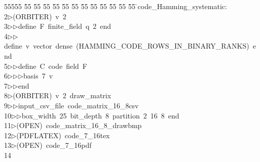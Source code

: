 %
%
\begin{tabbing}
55555 \= 55 \= 55 \= 55 \= 55 \= 55 \= 55 \= 55 \= 55 \= 55 \= 55 \= 55 \= 55 \= \>code\_Hamming\_systematic:\\[0pt]
2\>$\triangleright$\>(ORBITER)\ v\ 2\ \\[0pt]
3\>$\triangleright$\>$\triangleright$\>define\ F\ finite\_field\ q\ 2\ end\ \\[0pt]
4\>$\triangleright$\>$\triangleright$\>define\ v\ vector\ dense\ (HAMMING\_CODE\_ROWS\_IN\_BINARY\_RANKS)\ end\ \\[0pt]
5\>$\triangleright$\>$\triangleright$\>define\ C\ code\ field\ F\ \\[0pt]
6\>$\triangleright$\>$\triangleright$\>$\triangleright$\>basis\ 7\ v\ \\[0pt]
7\>$\triangleright$\>$\triangleright$\>end\\[0pt]
8\>$\triangleright$\>(ORBITER)\ v\ 2\ draw\_matrix\ \\[0pt]
9\>$\triangleright$\>$\triangleright$\>input\_csv\_file\ code\_matrix\_16\_8csv\ \\[0pt]
10\>$\triangleright$\>$\triangleright$\>box\_width\ 25\ bit\_depth\ 8\ partition\ 2\ 16\ 8\ end\\[0pt]
11\>$\triangleright$\>(OPEN)\ code\_matrix\_16\_8\_drawbmp\\[0pt]
12\>$\triangleright$\>(PDFLATEX)\ code\_7\_16tex\\[0pt]
13\>$\triangleright$\>(OPEN)\ code\_7\_16pdf\\[0pt]
14\>\end{tabbing}
